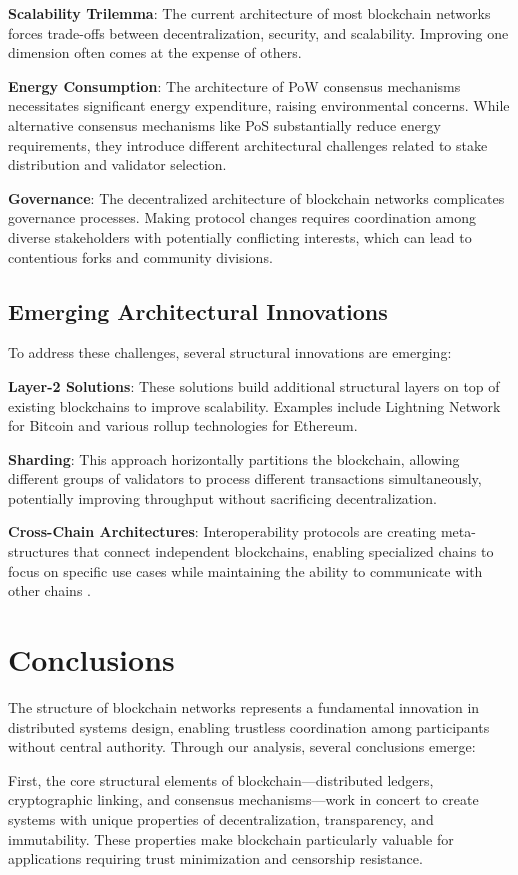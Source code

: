 \documentclass[twoside]{article}
\begin{document}
\textbf{Scalability Trilemma}: The current architecture of most blockchain networks forces trade-offs between decentralization, security, and scalability. Improving one dimension often comes at the expense of others.

\textbf{Energy Consumption}: The architecture of PoW consensus mechanisms necessitates significant energy expenditure, raising environmental concerns. While alternative consensus mechanisms like PoS substantially reduce energy requirements, they introduce different architectural challenges related to stake distribution and validator selection.

\textbf{Governance}: The decentralized architecture of blockchain networks complicates governance processes. Making protocol changes requires coordination among diverse stakeholders with potentially conflicting interests, which can lead to contentious forks and community divisions.

\subsection{Emerging Architectural Innovations}
To address these challenges, several structural innovations are emerging:

\textbf{Layer-2 Solutions}: These solutions build additional structural layers on top of existing blockchains to improve scalability. Examples include Lightning Network for Bitcoin and various rollup technologies for Ethereum.

\textbf{Sharding}: This approach horizontally partitions the blockchain, allowing different groups of validators to process different transactions simultaneously, potentially improving throughput without sacrificing decentralization.

\textbf{Cross-Chain Architectures}: Interoperability protocols are creating meta-structures that connect independent blockchains, enabling specialized chains to focus on specific use cases while maintaining the ability to communicate with other chains \cite{patnaik}.

\section{Conclusions}
The structure of blockchain networks represents a fundamental innovation in distributed systems design, enabling trustless coordination among participants without central authority. Through our analysis, several conclusions emerge:

First, the core structural elements of blockchain—distributed ledgers, cryptographic linking, and consensus mechanisms—work in concert to create systems with unique properties of decentralization, transparency, and immutability. These properties make blockchain particularly valuable for applications requiring trust minimization and censorship resistance.
\end{document}
